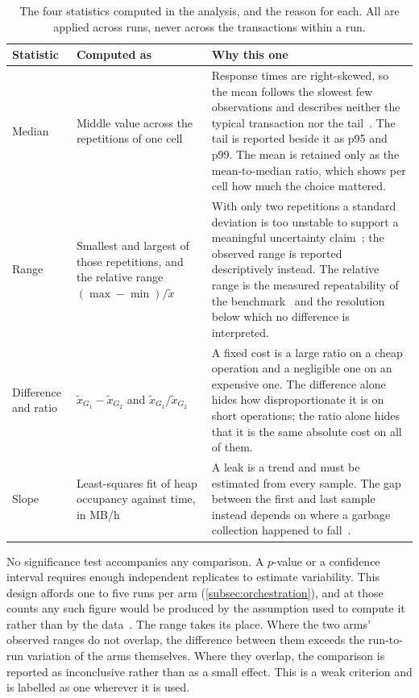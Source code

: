 \begin{table}[ht]
    \centering
    \small
    \setlength{\tabcolsep}{4pt}
    \begin{tabularx}{\textwidth}{@{}>{\raggedright\arraybackslash}p{2.1cm} >{\raggedright\arraybackslash}p{3.5cm} X@{}}
        \toprule
        \textbf{Statistic} & \textbf{Computed as} & \textbf{Why this one} \\
        \midrule
        Median & Middle value across the repetitions of one cell & Response times are right-skewed, so the mean follows the slowest few observations and describes neither the typical transaction nor the tail~\citep{hoefler2015scientific, dean2013tail}. The tail is reported beside it as p95 and p99. The mean is retained only as the mean-to-median ratio, which shows per cell how much the choice mattered. \\
        \addlinespace
        Range & Smallest and largest of those repetitions, and the relative range $(\max-\min)/\tilde{x}$ & With only two repetitions a standard deviation is too unstable to support a meaningful uncertainty claim~\citep{hoefler2015scientific}; the observed range is reported descriptively instead. The relative range is the measured repeatability of the benchmark~\citep{kistowski2015benchmark} and the resolution below which no difference is interpreted. \\
        \addlinespace
        Difference and ratio & $\tilde{x}_{G_1}-\tilde{x}_{G_2}$ and $\tilde{x}_{G_1}/\tilde{x}_{G_2}$ & A fixed cost is a large ratio on a cheap operation and a negligible one on an expensive one. The difference alone hides how disproportionate it is on short operations; the ratio alone hides that it is the same absolute cost on all of them. \\
        \addlinespace
        Slope & Least-squares fit of heap occupancy against time, in MB/h & A leak is a trend and must be estimated from every sample. The gap between the first and last sample instead depends on where a garbage collection happened to fall~\citep{gregg2012thinking}. \\
        \bottomrule
    \end{tabularx}
    \caption[Statistics used in the analysis]{The four statistics computed in the analysis, and the reason for each. All are applied across runs, never across the transactions within a run.}
    \label{tab:analysis-statistics}
\end{table}

No significance test accompanies any comparison. A $p$-value or a confidence interval requires enough independent replicates to estimate variability. This design affords one to five runs per arm (\cref{subsec:orchestration}), and at those counts any such figure would be produced by the assumption used to compute it rather than by the data~\citep{hoefler2015scientific}. The range takes its place. Where the two arms' observed ranges do not overlap, the difference between them exceeds the run-to-run variation of the arms themselves. Where they overlap, the comparison is reported as inconclusive rather than as a small effect. This is a weak criterion and is labelled as one wherever it is used.

